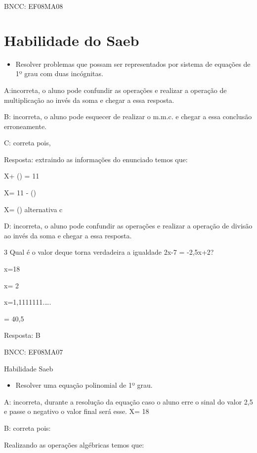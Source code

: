 BNCC: EF08MA08

\section{Habilidade do Saeb}

\begin{itemize}
\tightlist

\item 
  Resolver problemas que possam ser representados por sistema de
  equações de 1º grau com duas incógnitas.
\end{itemize}

A:incorreta, o aluno pode confundir as operações e realizar a operação
de multiplicação ao invés da soma e chegar a essa resposta.

B: incorreta, o aluno pode esquecer de realizar o m.m.c. e chegar a essa
conclusão erroneamente.

C: correta pois,

Resposta: extraindo as informações do enunciado temos que:

X+ () = 11

X= 11 - ()

X= () alternativa c

D: incorreta, o aluno pode confundir as operações e realizar a operação
de divisão ao invés da soma e chegar a essa resposta.

\num{3} Qual é o valor de\times que torna verdadeira a igualdade 2x-7 = -2,5x+2?

\item x=18
\item x= 2
\item x=1,1111111.\ldots.
\item\times = 40,5

Resposta: B

BNCC: EF08MA07

Habilidade Saeb

\begin{itemize}
\tightlist

\item 
  Resolver uma equação polinomial de 1º grau.
\end{itemize}

A: incorreta, durante a resolução da equação caso o aluno erre o sinal
do valor 2,5 e passe o negativo o valor final será esse. X= 18

B: correta pois:

Realizando as operações algébricas temos que:

